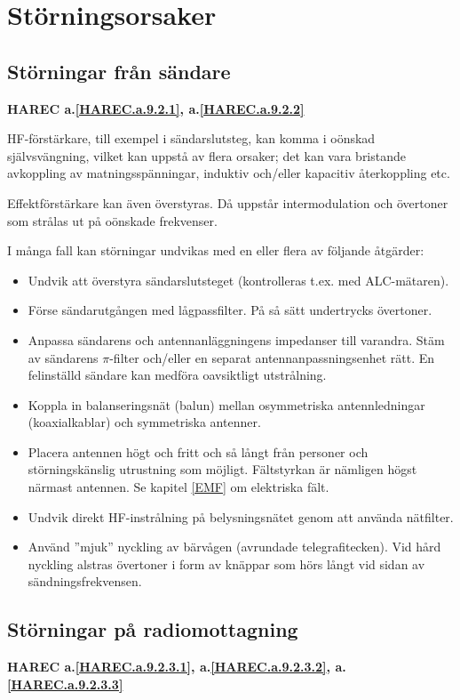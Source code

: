 \section{Störningsorsaker}

\subsection{Störningar från sändare}
\textbf{
HAREC a.\ref{HAREC.a.9.2.1}\label{myHAREC.a.9.2.1},
 a.\ref{HAREC.a.9.2.2}\label{myHAREC.a.9.2.2}
}

HF-förstärkare, till exempel i sändarslutsteg, kan komma i oönskad självsvängning,
vilket kan uppstå av flera orsaker; det kan vara bristande avkoppling av
matningsspänningar, induktiv och/eller kapacitiv återkoppling etc.

Effektförstärkare kan även överstyras.
Då uppstår intermodulation och övertoner som strålas ut på oönskade frekvenser.

I många fall kan störningar undvikas med en eller flera av följande åtgärder:
\begin{itemize}
\item Undvik att överstyra sändarslutsteget (kontrolleras t.ex. med
  ALC-mätaren).
\item Förse sändarutgången med lågpassfilter.
  På så sätt undertrycks övertoner.
\item Anpassa sändarens och antennanläggningens impedanser till varandra.
  Stäm av sändarens \(\pi\)-filter och/eller en separat antennanpassningsenhet
  rätt.
  En felinställd sändare kan medföra oavsiktligt utstrålning.
\item Koppla in balanseringsnät (balun) mellan osymmetriska antennledningar
  (koaxialkablar) och symmetriska antenner.
\item Placera antennen högt och fritt och så långt från personer och
  störningskänslig utrustning som möjligt.
  Fältstyrkan är nämligen högst närmast antennen.
  Se kapitel \ref{EMF} om elektriska fält.
\item Undvik direkt HF-instrålning på belysningsnätet genom att använda
  nätfilter.
\item Använd ''mjuk'' nyckling av bärvågen (avrundade telegrafitecken).
  Vid hård nyckling alstras övertoner i form av knäppar som hörs långt vid
  sidan av sändningsfrekvensen.
\end{itemize}

\subsection{Störningar på radiomottagning}
\textbf{
HAREC a.\ref{HAREC.a.9.2.3.1}\label{myHAREC.a.9.2.3.1},
 a.\ref{HAREC.a.9.2.3.2}\label{myHAREC.a.9.2.3.2},
 a.\ref{HAREC.a.9.2.3.3}\label{myHAREC.a.9.2.3.3}
}

